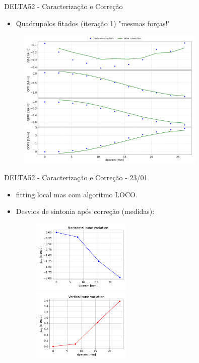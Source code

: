 \documentclass{beamer}					  %
\begin{document}
\begin{frame}{DELTA52 - Caracterização e Correção}
    \begin{itemize}
    		\item Quadrupolos fitados (iteração 1) "mesmas forças!"
    \end{itemize}
    \begin{figure}[H]
        	\centering
            \includegraphics[width=0.8\textwidth]{2024-01-26/figures/quads_stren_with_corr.png}
            \label{fig:bba}
    \end{figure} 
\end{frame}


\begin{frame}{DELTA52 - Caracterização e Correção - 23/01}
    \begin{itemize}
            \item fitting local mas com algoritmo LOCO.
    		\item Desvios de sintonia após correção (medidas):
    \end{itemize}
    \begin{figure}[H]
        	\centering
            \includegraphics[height=3.5cm, width=6cm]{2024-01-26/figures/Tunex_after_loco_2401.png}\\ 
            \includegraphics[height=3.5cm, width=6cm]{2024-01-26/figures/Tuney_after_loco_2401.png}\\ 
    \end{figure} 
\end{frame}
\end{document}
